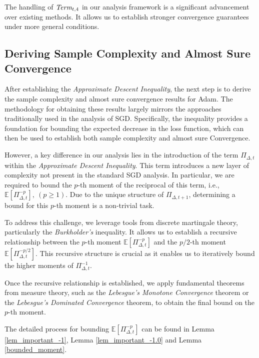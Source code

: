 \documentclass{article} %
\begin{document}
The handling of $\emph{Term}_{t,4}$ in our analysis framework is a significant advancement over existing methods. It allows us to establish stronger convergence guarantees under more general conditions.

\subsection{Deriving Sample Complexity and Almost Sure Convergence}\label{sec_2}
After establishing the \emph{Approximate Descent Inequality}, the next step is to derive the sample complexity and almost sure convergence results for Adam. The methodology for obtaining these results largely mirrors the approaches traditionally used in the analysis of SGD. Specifically, the inequality provides a foundation for bounding the expected decrease in the loss function, which can then be used to establish both sample complexity and almost sure Convergence.

However, a key difference in our analysis lies in the introduction of the term $\Pi_{\Delta,t}$ within the \emph{Approximate Descent Inequality}. This term introduces a new layer of complexity not present in the standard SGD analysis. In particular, we are required to bound the $p$-th moment of the reciprocal of this term, i.e., $\mathbb{E}[\Pi_{\Delta,t}^{-p}],\ (p\ge 1)$. Due to the unique structure of $\Pi_{\Delta,t+1}$, determining a bound for this $p$-th moment is a non-trivial task.

To address this challenge, we leverage tools from discrete martingale theory, particularly the \emph{Burkholder's} inequality. It allows us to establish a recursive relationship between the $p$-th moment $\mathbb{E}[\Pi_{\Delta,t}^{-p}]$ and the $p/2$-th moment $\mathbb{E}[\Pi_{\Delta,t}^{-p/2}]$. This recursive structure is crucial as it enables us to iteratively bound the higher moments of $\Pi_{\Delta,t}^{-1}$.

Once the recursive relationship is established, we apply fundamental theorems from measure theory, such as the \emph{Lebesgue's Monotone Convergence} theorem or the \emph{Lebesgue's Dominated Convergence} theorem, to obtain the final bound on the $p$-th moment. %

The detailed process for bounding $\mathbb{E}[\Pi_{\Delta,t}^{-p}]$ can be found in Lemma \ref{lem_important_-1}, Lemma \ref{lem_important_-1.0} and Lemma \ref{bounded_moment}. 
\end{document}

